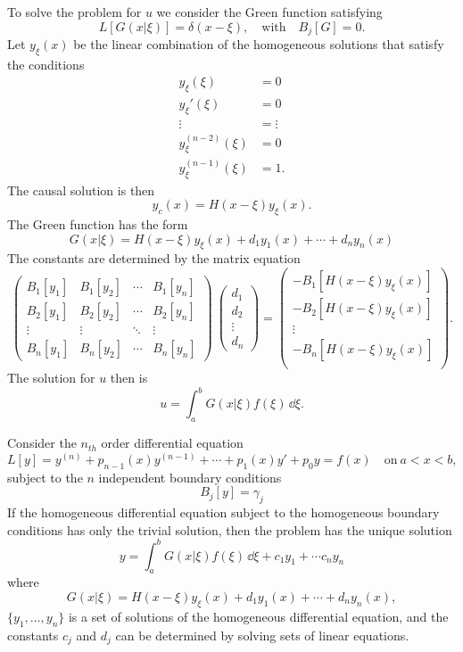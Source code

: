 To solve the problem for $u$ we consider the Green function satisfying
\[
L[G(x|\xi)] = \delta(x-\xi), \quad \mathrm{with} \quad B_j[G] = 0.
\]
Let $y_\xi(x)$ be the linear combination of the homogeneous solutions that
satisfy the conditions
\begin{align*}
  y_\xi(\xi) &= 0 \\
  y_\xi'(\xi) &= 0 \\
  \vdots \ \ &= \vdots \\
  y_\xi^{(n-2)}(\xi) &= 0 \\
  y_\xi^{(n-1)}(\xi) &= 1.
\end{align*}
The causal solution is then
\[
y_c(x) = H(x-\xi) y_\xi(x).
\]
The Green function has the form
\[
G(x|\xi) = H(x-\xi) y_\xi(x) + d_1 y_1(x) + \cdots + d_n y_n(x)
\]
The constants are determined by the matrix equation
\[
\begin{pmatrix}
  B_1[y_1] & B_1[y_2] & \cdots & B_1[y_n] \\
  B_2[y_1] & B_2[y_2] & \cdots & B_2[y_n] \\
  \vdots   & \vdots   & \ddots & \vdots   \\
  B_n[y_1] & B_n[y_2] & \cdots & B_n[y_n]
\end{pmatrix}
\
\begin{pmatrix}
  d_1 \\
  d_2 \\
  \vdots \\
  d_n
\end{pmatrix}
=
\begin{pmatrix}
  -B_1[H(x-\xi) y_\xi(x)] \\
  -B_2[H(x-\xi) y_\xi(x)] \\
  \vdots \\
  -B_n[H(x-\xi) y_\xi(x)] \\
\end{pmatrix}.
\]
The solution for $u$ then is
\[
u = \int_a^b G(x|\xi) f(\xi) \,\dd \xi.
\]



\begin{Result}
  Consider the $n_{t h}$ order differential equation
  \[
  L[y] = y^{(n)} + p_{n-1}(x) y^{(n-1)} + \cdots + p_1(x) y' + p_0 y = f(x)
  \quad \mathrm{on}\ a < x < b,
  \]
  subject to the $n$ independent boundary conditions
  \[
  B_j[y] = \gamma_j
  \]
  If the homogeneous differential equation subject to the homogeneous 
  boundary conditions has only the trivial solution, then the problem has 
  the unique solution
  \[
  y = \int_a^b G(x|\xi) f(\xi) \,\dd \xi + c_1 y_1 + \cdots c_n y_n
  \]
  where 
  \[
  G(x|\xi) = H(x-\xi) y_\xi(x) + d_1 y_1(x) + \cdots + d_n y_n(x),
  \]
  $\{y_1,\ldots,y_n\}$ is a set of solutions of the homogeneous 
  differential equation, and the constants $c_j$ and $d_j$ can be determined
  by solving sets of linear equations.
\end{Result}




















